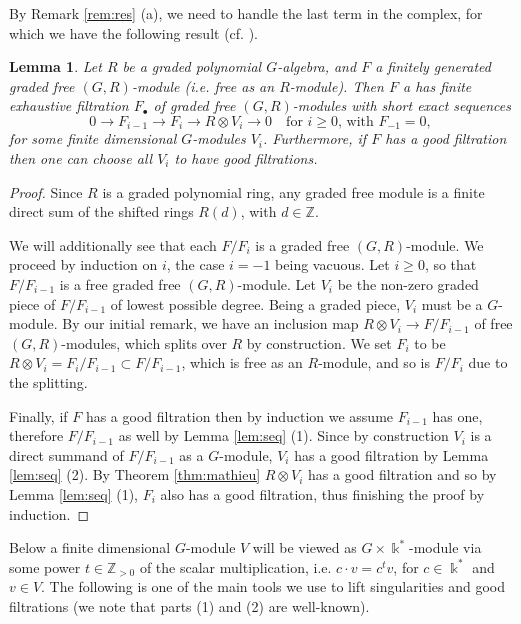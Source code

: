 \documentclass[11pt]{amsart}
\numberwithin{equation}{section}
\newtheorem{lemma}[equation]{Lemma}
\theoremstyle{definition}
\newcommand{\oo}{\otimes}
\newcommand{\bb}{\mathbb}
\newcommand{\kk}{\Bbbk}
\begin{document}
By Remark \ref{rem:res} (a), we need to handle the last term in the complex, for which we have the following result (cf. \cite[Chapter IV, Lemma 1.1.4]{hashibook}).

\begin{lemma}\label{lem:last}
Let $R$ be a graded polynomial $G$-algebra, and $F$ a finitely generated graded free $(G,R)$-module (i.e. free as an $R$-module). Then $F$ a has finite exhaustive filtration $F_\bullet$ of graded free $(G,R)$-modules with short exact sequences
\[0\to F_{i-1} \to F_i \to R\oo V_i \to 0 \quad \mbox{for } i\geq 0, \, \mbox{with } F_{-1}=0,\]
for some finite dimensional $G$-modules $V_i$. Furthermore, if $F$ has a good filtration then one can choose all $V_i$ to have good filtrations.
\end{lemma}

\begin{proof}
Since $R$ is a graded polynomial ring, any graded free module is a finite direct sum of the shifted rings $R(d)$, with $d\in \mathbb{Z}$.

We will additionally see that each $F/F_i$ is a graded free $(G,R)$-module. We proceed by induction on $i$, the case $i=-1$ being vacuous. Let $i\geq 0$, so that $F/F_{i-1}$ is a free graded free $(G,R)$-module. Let $V_i$ be the non-zero graded piece of $F/F_{i-1}$ of lowest possible degree. Being a graded piece, $V_i$ must be a $G$-module. By our initial remark, we have an inclusion map $R\oo V_i \to F/F_{i-1}$ of free $(G,R)$-modules, which splits over $R$ by construction. We set $F_i$ to be $R\oo V_i = F_{i}/F_{i-1} \subset F/F_{i-1}$, which is free as an $R$-module, and so is $F/F_i$ due to the splitting.

Finally, if $F$ has a good filtration then by induction we assume $F_{i-1}$ has one, therefore $F/F_{i-1}$ as well by Lemma \ref{lem:seq} (1). Since by construction $V_i$ is a direct summand of $F/F_{i-1}$ as a $G$-module, $V_i$ has a good filtration by Lemma \ref{lem:seq} (2). By Theorem \ref{thm:mathieu} $R\oo V_i$ has a good filtration and so by Lemma \ref{lem:seq} (1), $F_i$ also has a good filtration, thus finishing the proof by induction.
\end{proof}


Below a finite dimensional $G$-module $V$ will be viewed as $G\times \kk^*$-module via some power $t\in \bb{Z}_{>0}$ of the scalar multiplication, i.e. $c \cdot v = c^t v$, for $c \in \kk^*$ and $v\in V$. The following is one of the main tools we use to lift singularities and good filtrations (we note that parts (1) and (2) are well-known).
\end{document}
